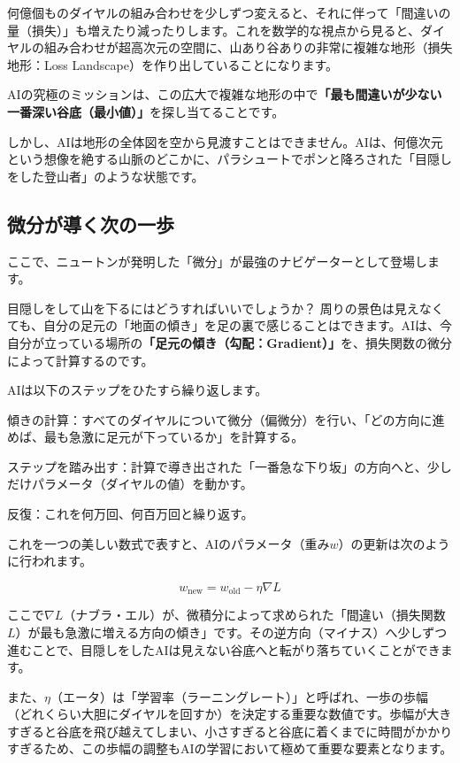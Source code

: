 何億個ものダイヤルの組み合わせを少しずつ変えると、それに伴って「間違いの量（損失）」も増えたり減ったりします。これを数学的な視点から見ると、ダイヤルの組み合わせが超高次元の空間に、山あり谷ありの非常に複雑な地形（損失地形：Loss Landscape）を作り出していることになります。

AIの究極のミッションは、この広大で複雑な地形の中で\textbf{「最も間違いが少ない一番深い谷底（最小値）」}を探し当てることです。

しかし、AIは地形の全体図を空から見渡すことはできません。AIは、何億次元という想像を絶する山脈のどこかに、パラシュートでポンと降ろされた「目隠しをした登山者」のような状態です。

\subsection{微分が導く次の一歩}

ここで、ニュートンが発明した「微分」が最強のナビゲーターとして登場します。

目隠しをして山を下るにはどうすればいいでしょうか？ 周りの景色は見えなくても、自分の足元の「地面の傾き」を足の裏で感じることはできます。AIは、今自分が立っている場所の\textbf{「足元の傾き（勾配：Gradient）」}を、損失関数の微分によって計算するのです。

AIは以下のステップをひたすら繰り返します。

傾きの計算：すべてのダイヤルについて微分（偏微分）を行い、「どの方向に進めば、最も急激に足元が下っているか」を計算する。

ステップを踏み出す：計算で導き出された「一番急な下り坂」の方向へと、少しだけパラメータ（ダイヤルの値）を動かす。

反復：これを何万回、何百万回と繰り返す。

これを一つの美しい数式で表すと、AIのパラメータ（重み\(w\)）の更新は次のように行われます。

\[
w_{\mathrm{new}}=w_{\mathrm{old}}-\eta\nabla L
\]

ここで\(\nabla L\)（ナブラ・エル）が、微積分によって求められた「間違い（損失関数\(L\)）が最も急激に増える方向の傾き」です。その逆方向（マイナス）へ少しずつ進むことで、目隠しをしたAIは見えない谷底へと転がり落ちていくことができます。

また、\(\eta\)（エータ）は「学習率（ラーニングレート）」と呼ばれ、一歩の歩幅（どれくらい大胆にダイヤルを回すか）を決定する重要な数値です。歩幅が大きすぎると谷底を飛び越えてしまい、小さすぎると谷底に着くまでに時間がかかりすぎるため、この歩幅の調整もAIの学習において極めて重要な要素となります。

